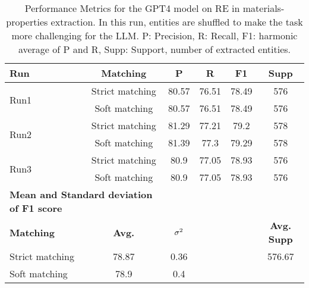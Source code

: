 \begin{table}[htbp]
    \small
    \centering
    \caption{Performance Metrics for the GPT4 model on RE in materials-properties extraction. In this run, entities are shuffled to make the task more challenging for the LLM. P: Precision, R: Recall, F1: harmonic average of P and R, Supp: Support, number of extracted entities.}
    \begin{tabular}{lccccc}
        \toprule
        \textbf{Run} & \textbf{Matching} & \textbf{P} & \textbf{R} & \textbf{F1} & \textbf{Supp} \\
        \midrule
        \multirow{2}{*}{Run1} & Strict matching & 80.57 & 76.51 & 78.49 & 576 \\
        & Soft matching & 80.57 & 76.51 & 78.49 & 576 \\
        \midrule
        \multirow{2}{*}{Run2} & Strict matching & 81.29 & 77.21 & 79.2 & 578 \\
        & Soft matching & 81.39 & 77.3 & 79.29 & 578 \\
        \midrule
        \multirow{2}{*}{Run3} & Strict matching & 80.9 & 77.05 & 78.93 & 576 \\
        & Soft matching & 80.9 & 77.05 & 78.93 & 576 \\
        \midrule
        \multicolumn{2}{l}{\textbf{Mean and Standard deviation of F1 score}} & & & & \\
        \midrule
        \textbf{Matching} & \textbf{Avg.} & $\sigma\textsuperscript{2}$ & & & \textbf{Avg. Supp}\\
        Strict matching & 78.87 & 0.36 & & & 576.67 \\
        Soft matching & 78.9 & 0.4 & & \\
        \bottomrule
    \end{tabular}
\end{table}



